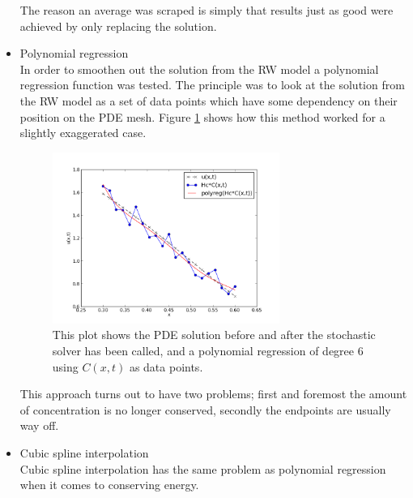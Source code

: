\begin{itemize}
 The reason an average was scraped is simply that results just as good were achieved by only replacing the solution.
 \item Polynomial regression \\
 In order to smoothen out the solution from the RW model a polynomial regression function was tested. 
 The principle was to look at the solution from the RW model as a set of data points which have some dependency on their position on the PDE mesh. 
 Figure \ref{theory:polyreg} shows how this method worked for a slightly exaggerated case. 
 \begin{figure}[h]
 \centering
 \includegraphics[width=0.7\textwidth]{Figures/polyreg.png}
 \caption[Combination by polynomial regression]{This plot shows the PDE solution before and after the stochastic solver has been called, and a polynomial regression of degree 6 using $C(x,t)$ as data points. }
 \label{theory:polyreg}
 \end{figure}
 This approach turns out to have two problems; first and foremost the amount of concentration is no longer conserved, secondly the endpoints are usually way off.
 \item Cubic spline interpolation \\
 Cubic spline interpolation has the same problem as polynomial regression when it comes to conserving energy.
\end{itemize}